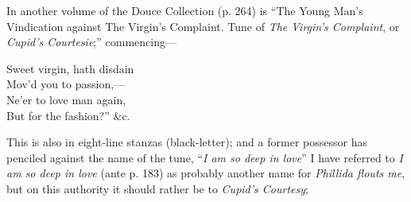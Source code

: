 In another volume of the Douce Collection (p. 264) is “The Young Man’s
Vindication against The Virgin’s Complaint. Tune of \textit{The Virgin’s Complaint},
or \textit{Cupid’s Courtesie};” commencing—
\settowidth{\versewidth}{Sweet virgin, hath disdain}
\begin{dcverse}\begin{altverse}
Sweet virgin, hath disdain\\
Mov’d you to passion,—\\
Ne’er to love man again,\\
But for the fashion?” \&c.
\end{altverse}
\end{dcverse}

\pagebreak

This is also in eight-line stanzas (black-letter); and a former possessor has
penciled against the name of the tune, “\textit{I am so deep in love}” I have referred
to \textit{I am so deep in love} (ante p. 183) as probably another name for \textit{Phillida flouts
me}, but on this authority it should rather be to \textit{Cupid's Courtesy};




